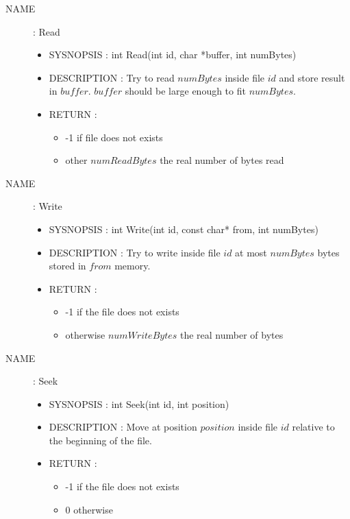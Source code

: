 \documentclass[a4paper,10pt]{article}
\begin{document}
\begin{description}
    \item [NAME] : Read
        \begin{itemize}
            \item SYSNOPSIS : int Read(int id, char *buffer, int numBytes)
            \item DESCRIPTION :
                Try to read $numBytes$ inside file $id$ and store result in $buffer$.
                $buffer$ should be large enough to fit $numBytes$.
            \item RETURN :
                \begin{itemize}
                    \item -1 if file does not exists
                    \item other $numReadBytes$ the real number of bytes read
                \end{itemize}
        \end{itemize}

    \item [NAME] : Write
        \begin{itemize}
            \item SYSNOPSIS : int Write(int id, const char* from, int numBytes)
            \item DESCRIPTION :
                Try to write inside file $id$ at most $numBytes$ bytes stored in $from$
                memory.
            \item RETURN :
                \begin{itemize}
                    \item -1 if the file does not exists
                    \item otherwise $numWriteBytes$ the real number of bytes
                \end{itemize}
        \end{itemize}

    \item [NAME] : Seek
        \begin{itemize}
            \item SYSNOPSIS : int Seek(int id, int position)
            \item DESCRIPTION :
                Move at position $position$ inside file $id$ relative to the beginning of
                the file.
            \item RETURN :
                \begin{itemize}
                    \item -1 if the file does not exists
                    \item 0 otherwise
                \end{itemize}
        \end{itemize}


\end{description}
\end{document}
